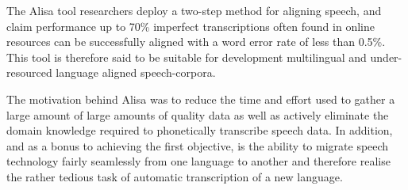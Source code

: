 The Alisa tool researchers deploy a two-step method for aligning speech, and claim performance up to 70\% imperfect transcriptions often found in online resources can be successfully aligned with a word error rate of less than 0.5\%.  This tool is therefore said to be suitable for development multilingual and under-resourced language aligned speech-corpora.

The motivation behind Alisa was to reduce the time and effort used to gather a large amount of large amounts of quality data as well as actively eliminate the domain knowledge required to phonetically transcribe speech data.  In addition, and as a bonus to achieving the first objective, is the ability to migrate speech technology fairly seamlessly from one language to another and therefore realise the rather tedious task of automatic transcription of a new language.

